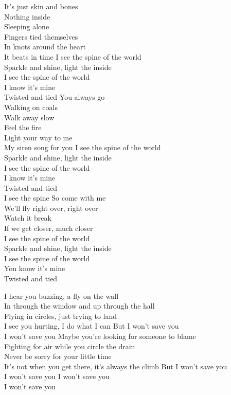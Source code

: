 \begin{flushleft}
It's just skin and bones\\
Nothing inside\\
Sleeping alone\\
Fingers tied themselves\\
In knots around the heart\\
It beats in time
\hops
I see the spine of the world\\
Sparkle and shine, light the inside\\
I see the spine of the world\\
I know it's mine\\
Twisted and tied
\hops
You always go\\
Walking on coals\\
Walk away slow\\
Feel the fire\\
Light your way to me\\
My siren song for you
\hops
I see the spine of the world\\
Sparkle and shine, light the inside\\
I see the spine of the world\\
I know it's mine\\
Twisted and tied\\
I see the spine
\hops
So come with me\\
We'll fly right over, right over\\
Watch it break\\
If we get closer, much closer\\
\hops
I see the spine of the world\\
Sparkle and shine, light the inside\\
I see the spine of the world\\
You know it's mine\\
Twisted and tied
\end{flushleft}
\newpage

\begin{flushleft}
I hear you buzzing, a fly on the wall \tab{}\\
In through the window and up through the hall \\
Flying in circles, just trying to land\tab{}\\
I see you hurting, I do what I can \tab{}
\hops
But I won't save you\tab{}\\
I won't save you \tab{}
\hops
Maybe you're looking for someone to blame\\
Fighting for air while you circle the drain\\
Never be sorry for your little time\\
It's not when you get there, it's always the climb
\hops
But I won't save you\\
I won't save you
\hops
I won't save you\\
I won't save you
\end{flushleft}
\newpage

